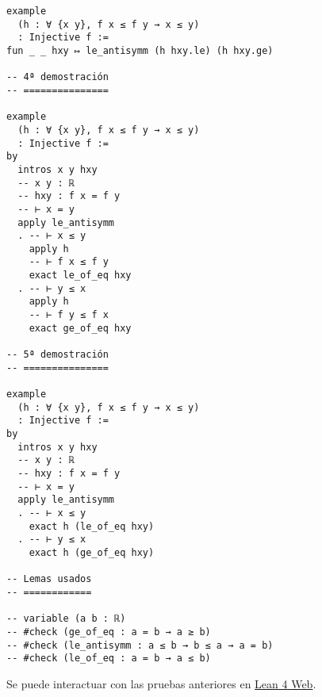 \begin{verbatim}
example
  (h : ∀ {x y}, f x ≤ f y → x ≤ y)
  : Injective f :=
fun _ _ hxy ↦ le_antisymm (h hxy.le) (h hxy.ge)

-- 4ª demostración
-- ===============

example
  (h : ∀ {x y}, f x ≤ f y → x ≤ y)
  : Injective f :=
by
  intros x y hxy
  -- x y : ℝ
  -- hxy : f x = f y
  -- ⊢ x = y
  apply le_antisymm
  . -- ⊢ x ≤ y
    apply h
    -- ⊢ f x ≤ f y
    exact le_of_eq hxy
  . -- ⊢ y ≤ x
    apply h
    -- ⊢ f y ≤ f x
    exact ge_of_eq hxy

-- 5ª demostración
-- ===============

example
  (h : ∀ {x y}, f x ≤ f y → x ≤ y)
  : Injective f :=
by
  intros x y hxy
  -- x y : ℝ
  -- hxy : f x = f y
  -- ⊢ x = y
  apply le_antisymm
  . -- ⊢ x ≤ y
    exact h (le_of_eq hxy)
  . -- ⊢ y ≤ x
    exact h (ge_of_eq hxy)

-- Lemas usados
-- ============

-- variable (a b : ℝ)
-- #check (ge_of_eq : a = b → a ≥ b)
-- #check (le_antisymm : a ≤ b → b ≤ a → a = b)
-- #check (le_of_eq : a = b → a ≤ b)
\end{verbatim}
Se puede interactuar con las pruebas anteriores en \href{https://lean.math.hhu.de/\#url=https://raw.githubusercontent.com/jaalonso/Calculemus2/main/src/Si\_f(x)\_leq\_f(y)\_to\_x\_leq\_y,\_entonces\_f\_es\_inyectiva.lean}{Lean 4 Web}.

